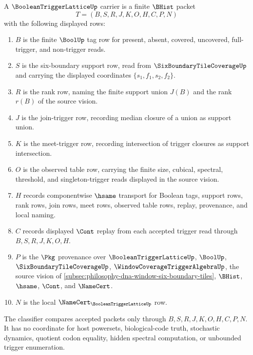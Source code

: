 \begin{definition}
\label{def:boolean-trigger-lattice-carrier}
A $\BooleanTriggerLatticeUp$ carrier is a finite $\BHist$ packet
$$
T=(B,S,R,J,K,O,H,C,P,N)
$$
with the following displayed rows:
\begin{enumerate}
\item $B$ is the finite $\BoolUp$ tag row for present, absent, covered, uncovered, full-trigger, and non-trigger reads.
\item $S$ is the six-boundary support row, read from $\SixBoundaryTileCoverageUp$ and carrying the displayed coordinates $\{s_{1},f_{1},s_{2},f_{2}\}$.
\item $R$ is the rank row, naming the finite support union $J(B)$ and the rank $r(B)$ of the source vision.
\item $J$ is the join-trigger row, recording median closure of a union as support union.
\item $K$ is the meet-trigger row, recording intersection of trigger closures as support intersection.
\item $O$ is the observed table row, carrying the finite size, cubical, spectral, threshold, and singleton-trigger reads displayed in the source vision.
\item $H$ records componentwise $\hsame$ transport for Boolean tags, support rows, rank rows, join rows, meet rows, observed table rows, replay, provenance, and local naming.
\item $C$ records displayed $\Cont$ replay from each accepted trigger read through $B,S,R,J,K,O,H$.
\item $P$ is the $\Pkg$ provenance over $\BooleanTriggerLatticeUp$, $\BoolUp$, $\SixBoundaryTileCoverageUp$, $\WindowCoverageTriggerAlgebraUp$, the source vision of \autoref{subsec:philosophy-dna-window-six-boundary-tiles}, $\BHist$, $\hsame$, $\Cont$, and $\NameCert$.
\item $N$ is the local $\NameCert_{\BooleanTriggerLatticeUp}$ row.
\end{enumerate}
The classifier compares accepted packets only through $B,S,R,J,K,O,H,C,P,N$. It has no coordinate for host powersets, biological-code truth, stochastic dynamics, quotient codon equality, hidden spectral computation, or unbounded trigger enumeration.
\end{definition}

